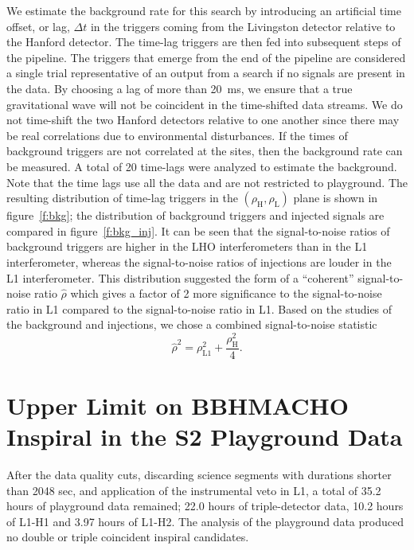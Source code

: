 We estimate the background rate for this search by introducing an artificial
time offset, or {lag}, $\Delta t$ in the triggers coming from the Livingston
detector relative to the Hanford detector.  The time-lag triggers are then fed
into subsequent steps of the pipeline.  The triggers that emerge from the end
of the pipeline are considered a single trial representative of an output from
a search if no signals are present in the data.   By choosing a lag of more
than 20~ms, we ensure that a true gravitational wave will not be coincident in
the time-shifted data streams.  We do not time-shift the two Hanford detectors
relative to one another since there may be real correlations due to
environmental disturbances.  If the times of background triggers are not
correlated at the sites, then the background rate can be measured. A total of
20 time-lags were analyzed to estimate the background. Note that the time lags
use all the data and are not restricted to playground. The resulting
distribution of time-lag triggers in the
$(\rho_{\mathrm{H}},\rho_{\mathrm{L}})$ plane is shown in figure~\ref{f:bkg};
the distribution of background triggers and injected signals are compared in
figure~\ref{f:bkg_inj}. It can be seen that the signal-to-noise ratios of
background triggers are higher in the LHO interferometers than in the L1
interferometer, whereas the signal-to-noise ratios of injections are louder in the
L1 interferometer. This distribution suggested the form of a ``coherent''
signal-to-noise ratio $\hat{\rho}$ which gives a factor of 2 more significance
to the signal-to-noise ratio in L1 compared to the signal-to-noise ratio in
L1. Based on the studies of the background and injections, we chose a
combined signal-to-noise statistic
\begin{equation}
\hat{\rho}^2 = \rho^2_{\mathrm{L1}} +  \frac{\rho_{\mathrm{H}}^2 }{ 4 }.
\label{eq:combinedsnr}
\end{equation}

\section{Upper Limit on BBHMACHO Inspiral in the S2 Playground Data}
\label{s:s2upperlimit}

After the data quality cuts, discarding science segments with durations
shorter than 2048 sec, and application of the instrumental veto in L1, a
total of {35.2} hours of playground data remained; {22.0} hours of
triple-detector data,  {10.2} hours of L1-H1 and {3.97} hours of L1-H2. The
analysis of the playground data produced no double or triple coincident
inspiral candidates.

